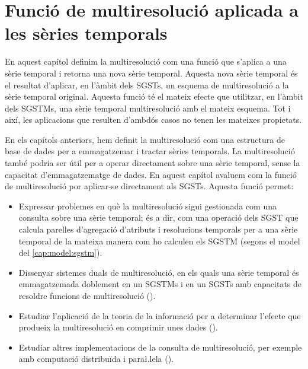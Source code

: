
\chapter{Funció de multiresolució aplicada a les sèries temporals}
\label{cap:funciomultiresolucio}


En aquest capítol definim la multiresolució com una funció que
s'aplica a una sèrie temporal i retorna una nova sèrie temporal.
Aquesta nova sèrie temporal és el resultat d'aplicar, en l'àmbit dels
\glspl{SGST}, un esquema de multiresolució a la sèrie temporal
original. Aquesta funció té el mateix efecte que utilitzar, en l'àmbit
dels \glspl{SGSTM}, una sèrie temporal multiresolució amb el mateix
esquema. Tot i així, les aplicacions que resulten d'ambdós casos no
tenen les mateixes propietats.



En els capítols anteriors, hem definit la multiresolució com una
estructura de base de dades per a emmagatzemar i tractar sèries
temporals. La multiresolució també podria ser útil per a operar
directament sobre una sèrie temporal, sense la capacitat
d'emmagatzematge de dades. En aquest capítol avaluem com la funció de
multiresolució por aplicar-se directament als \glspl{SGST}. Aquesta
funció permet:
\begin{itemize}

\item Expressar problemes en què la multiresolució sigui gestionada
  com una consulta sobre una sèrie temporal; és a dir, com una
  operació dels \gls{SGST} que calcula parelles d'agregació d'atributs
  i resolucions temporals per a una sèrie temporal de la mateixa
  manera com ho calculen els \gls{SGSTM} (segons el model del
  \autoref{cap:model:sgstm}).

\item Dissenyar sistemes duals de multiresolució, en els quals una
  sèrie temporal és emmagatzemada doblement en un \glspl{SGSTM} i en
  un \glspl{SGST} amb capacitats de resoldre funcions de
  multiresolució ().

\item Estudiar l'aplicació de la teoria de la informació per a
  determinar l'efecte que produeix la multiresolució en comprimir unes
  dades ().

\item Estudiar altres implementacions de la consulta de
  multiresolució, per exemple amb computació distribuïda i para\l.lela
  ().

\end{itemize}




